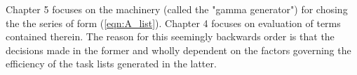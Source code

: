 \noindent Chapter 5 focuses on the machinery (called the "gamma generator") for
chosing the the series of form (\ref{eqn:A_list}). Chapter 4 focuses on
evaluation of terms contained therein. The reason for this seemingly backwards
order is that the decisions made in the former and wholly dependent on the
factors governing the efficiency of the task lists generated in the latter.\\


